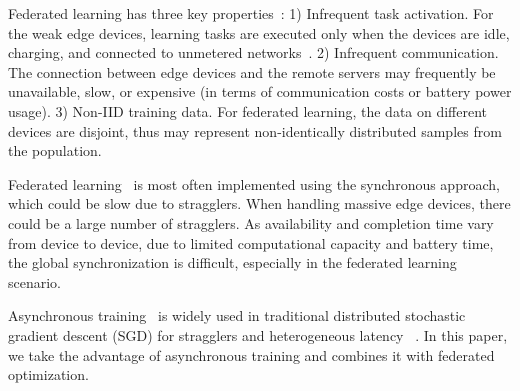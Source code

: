 \documentclass{opt2020} %
\begin{document}
Federated learning has three key properties~\cite{konevcny2016federated,mcmahan2016communication}:
1) Infrequent task activation. For the weak edge devices, learning tasks are executed only when the devices are idle, charging, and connected to unmetered networks~\cite{bonawitz2019towards}.
2) Infrequent communication. The connection between edge devices and the remote servers may frequently be unavailable, slow, or expensive (in terms of communication costs or battery power usage).
3) Non-IID training data. For federated learning, the data on different devices are disjoint, thus may represent non-identically distributed samples from the population.

Federated learning~\cite{mcmahan2016communication,bonawitz2019towards} is most often implemented using the synchronous approach, which could be slow due to stragglers.
When handling massive edge devices, there could be a large number of stragglers.
As availability and completion time vary from device to device, due to limited computational capacity and battery time, the global synchronization is difficult, especially in the federated learning scenario.

Asynchronous training~\cite{zinkevich2009slow,lian2017asynchronous,zheng2017asynchronous} is widely used in traditional distributed stochastic gradient descent (SGD) for stragglers and heterogeneous latency ~\cite{zinkevich2009slow,lian2017asynchronous,zheng2017asynchronous}.
In this paper, we take the advantage of asynchronous training and combines it with federated optimization.
\end{document}
